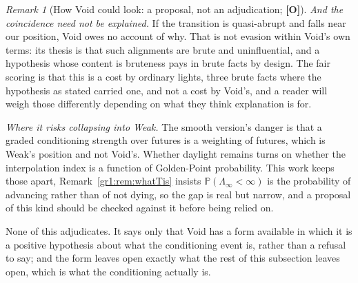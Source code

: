 \documentclass[11pt]{article}
\numberwithin{equation}{section}
\theoremstyle{plain}
\theoremstyle{definition}
\theoremstyle{remark}
\newtheorem{remark}[theorem]{Remark}
\newcommand{\PP}{\mathbb{P}}
\begin{document}
\begin{remark}[How Void could look: a proposal, not an adjudication;
\textbf{[O]}]
\emph{And the coincidence need not be explained.} If the transition is
quasi-abrupt and falls near our position, Void owes no account of why.
That is not evasion within Void's own terms: its thesis is that such
alignments are brute and uninfluential, and a hypothesis whose content
is bruteness pays in brute facts by design. The fair scoring is that
this is a cost by ordinary lights, three brute facts where the
hypothesis as stated carried one, and not a cost by Void's, and a
reader will weigh those differently depending on what they think
explanation is for.

\emph{Where it risks collapsing into Weak.} The smooth version's danger
is that a graded conditioning strength over futures is a weighting of
futures, which is Weak's position and not Void's. Whether daylight
remains turns on whether the interpolation index is a function of
Golden-Point probability. This work keeps those apart, Remark~\ref{gr1:rem:whatTis} insists $\PP(\Lambda_\infty<\infty)$ is the
probability of advancing rather than of not dying, so the gap is real
but narrow, and a proposal of this kind should be checked against it
before being relied on.

None of this adjudicates. It says only that Void has a form available in
which it is a positive hypothesis about what the conditioning event is,
rather than a refusal to say; and the form leaves open exactly what the
rest of this subsection leaves open, which is what the conditioning
actually is.
\end{remark}
\end{document}
